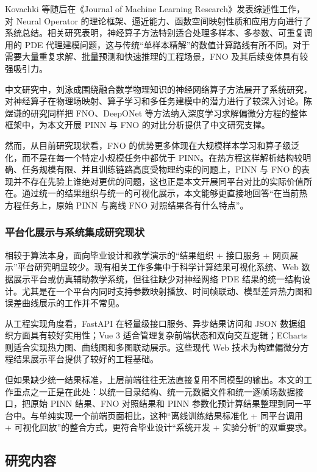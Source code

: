 \documentclass[UTF8,zihao=-4]{oucart}
\begin{document}
Kovachki 等随后在《Journal of Machine Learning Research》发表综述性工作，对 Neural Operator 的理论框架、逼近能力、函数空间映射性质和应用方向进行了系统总结\cite{kovachki2023}。相关研究表明，神经算子方法特别适合处理多样本、多参数、可重复调用的 PDE 代理建模问题，这与传统“单样本精解”的数值计算路线有所不同。对于需要大量重复求解、批量预测和快速推理的工程场景，FNO 及其后续变体具有较强吸引力。

中文研究中，刘泳成围绕融合数学物理知识的神经网络算子方法展开了系统研究，对神经算子在物理场映射、算子学习和多任务建模中的潜力进行了较深入讨论\cite{liu2026operator}。陈煜谦的研究同样把 FNO、DeepONet 等方法纳入深度学习求解偏微分方程的整体框架中，为本文开展 PINN 与 FNO 的对比分析提供了中文研究支撑\cite{chen2024deeppde}。

然而，从目前研究现状看，FNO 的优势更多体现在大规模样本学习和算子级泛化，而不是在每一个特定小规模任务中都优于 PINN。在热方程这样解析结构较明确、任务规模有限、并且训练链路高度受物理约束的问题上，PINN 与 FNO 的表现并不存在先验上谁绝对更优的问题，这也正是本文开展同平台对比的实际价值所在。通过统一的结果组织与统一的可视化展示，本文能够更直接地回答“在当前热方程任务上，原始 PINN 与离线 FNO 对照结果各有什么特点”。

\subsubsection{平台化展示与系统集成研究现状}

相较于算法本身，面向毕业设计和教学演示的“结果组织 + 接口服务 + 网页展示”平台研究明显较少。现有相关工作多集中于科学计算结果可视化系统、Web 数据展示平台或仿真辅助教学系统，但往往缺少对神经网络 PDE 结果的统一结构设计。尤其是在一个平台内同时支持参数映射播放、时间帧联动、模型差异热力图和误差曲线展示的工作并不常见。

从工程实现角度看，FastAPI 在轻量级接口服务、异步结果访问和 JSON 数据组织方面具有较好实用性\cite{fastapi_docs}；Vue 3 适合管理复杂前端状态和双向交互逻辑\cite{vue_docs}；ECharts 则适合实现热力图、曲线图和多图联动展示\cite{echarts_docs}。这些现代 Web 技术为构建偏微分方程结果展示平台提供了较好的工程基础。

但如果缺少统一结果标准，上层前端往往无法直接复用不同模型的输出。本文的工作重点之一正是在此处：以统一目录结构、统一元数据文件和统一逐帧场数据接口，把原始 PINN 结果、FNO 对照结果和 PINN 参数化预计算结果整理到同一平台中。与单纯实现一个前端页面相比，这种“离线训练结果标准化 + 同平台调用 + 可视化回放”的整合方式，更符合毕业设计“系统开发 + 实验分析”的双重要求。

\subsection{研究内容}
\end{document}
